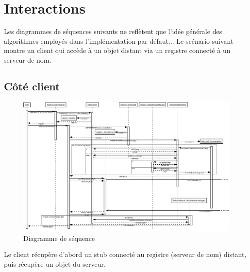 \chapter{Interactions}

Les diagrammes de séquences suivants ne reflètent que l'idée générale des algorithmes employés dans l'implémentation par défaut... Le scénario suivant montre un client qui accède à un objet distant via un registre connecté à un serveur de nom.

\section{Côté client}
\begin{figure}[H]
\begin{center}
\includegraphics[scale=0.45,angle=90]{img/diag_sequence_client.jpeg}
\caption{Diagramme de séquence}
\end{center}
\end{figure}
\medskip
Le client récupère d'abord un stub connecté au registre (serveur de nom) distant, puis récupère un objet du serveur.

